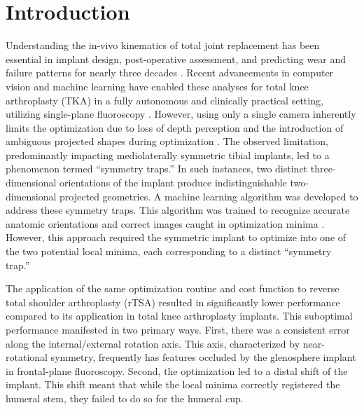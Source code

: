 \section{Introduction}
Understanding the in-vivo kinematics of total joint replacement has been essential in implant design, post-operative assessment, and predicting wear and failure patterns for nearly three decades \cite{freglyComputationalWearPrediction2005,banks2003HapPaul2004,banksRationaleResultsFixedBearing2019}.
Recent advancements in computer vision and machine learning have enabled these analyses for total knee arthroplasty (TKA) in a fully autonomous and clinically practical setting, utilizing single-plane fluoroscopy \cite{brobergValidationMachineLearning2023,jensenJointTrackMachine2023}.
However, using only a single camera inherently limits the optimization due to loss of depth perception and the introduction of ambiguous projected shapes during optimization \cite{floodAutomatedRegistration3D2018,mahfouzRobustMethodRegistration2003,zuffiModelbasedMethodReconstruction1999,banksAccurateMeasurementThreedimensional1996}.
The observed limitation, predominantly impacting mediolaterally symmetric tibial implants, led to a phenomenon termed “symmetry traps.”
In such instances, two distinct three-dimensional orientations of the implant produce indistinguishable two-dimensional projected geometries.
A machine learning algorithm was developed to address these symmetry traps. This algorithm was trained to recognize accurate anatomic orientations and correct images caught in optimization minima \cite{jensenCorrectingSymmetricImplantInReview}.
However, this approach required the symmetric implant to optimize into one of the two potential local minima, each corresponding to a distinct “symmetry trap.”

The application of the same optimization routine and cost function \cite{floodAutomatedRegistration3D2018,jensenJointTrackMachine2023} to reverse total shoulder arthroplasty (rTSA) resulted in significantly lower performance compared to its application in total knee arthroplasty implants.
This suboptimal performance manifested in two primary ways.
First, there was a consistent error along the internal/external rotation axis.
This axis, characterized by near-rotational symmetry, frequently has features occluded by the glenosphere implant in frontal-plane fluoroscopy.
Second, the optimization led to a distal shift of the implant.
This shift meant that while the local minima correctly registered the humeral stem, they failed to do so for the humeral cup.

